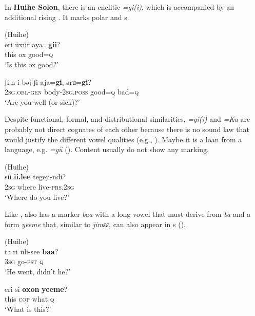 In \textbf{Huihe Solon}, there is an enclitic \textit{=gi(i)}, which is accompanied by an additional rising . It marks polar and s.

\ea%
    \label{ex:tungu:25}
     (Huihe)\\
    \ea
    \gll eri  üxür  aya=\textbf{{gii}}?\\
    this  ox  good=\textsc{q}\\
    \glt ‘Is this ox good?’ \citep[7]{Tsumagari2009a}
    
    \ex
    \gll ʃi.n-i    bəj-ʃi aja=\textbf{{gi}}, ərʉ=\textbf{{gi}}?\\
    2\textsc{sg}.\textsc{obl}-\textsc{gen}  body-2\textsc{sg.poss}  good=\textsc{q}  bad=\textsc{q}\\
    \glt ‘Are you well (or sick)?’ \citep[316]{Chaoke2009}
    \z
    \z

Despite functional, formal, and distributional similarities,  \textit{=gi(i)} and  \textit{=Ku} are probably not direct cognates of each other because there is no sound law that would justify the different vowel qualities (e.g., \citealt{Benzing1956,Doerfer1978b}). Maybe it is a loan from a  language, e.g.  \textit{=gü} (). Content  usually do not show any marking.

\ea%
    \label{ex:tungu:26}
     (Huihe)\\
    \gll sii \textbf{{ii}}\textbf{.}\textbf{{lee}} tegeji-ndi?\\
    2\textsc{sg}  where  live-\textsc{prs}.2\textsc{sg}\\
    \glt ‘Where do you live?’ \citep[15]{Tsumagari2009a}
    \z

Like ,  also has a marker \textit{baa} with a long vowel that must derive from  \textit{ba}  and a form \textit{yeeme} that, similar to   \textit{jimɛɛ}, can also appear in s ().

\ea%
    \label{ex:tungu:27}
     (Huihe)\\
    \ea
    \gll ta.ri  üli-see \textbf{{baa}}?\\
    3\textsc{sg}  go-\textsc{pst}    \textsc{q}\\
    \glt ‘He went, didn’t he?’
    
    \ex
    \gll eri si \textbf{{oxon}} \textbf{{yeeme}}?\\
    this  \textsc{cop}  what  \textsc{q}\\
    \glt ‘What is this?’ \citep[15]{Tsumagari2009a}
    \z
    \z

